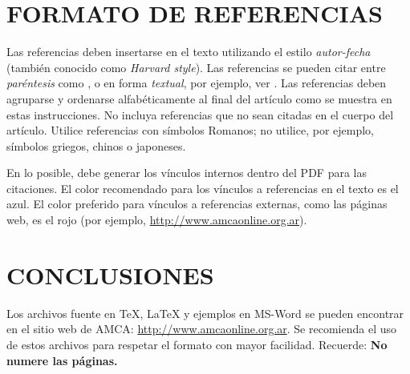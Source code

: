 \documentclass[oneside,a4paper,spanish,links]{amca}
\begin{document}
\section{FORMATO DE  REFERENCIAS}

Las referencias deben insertarse en el texto utilizando el estilo
\emph{autor-fecha} (también conocido como \emph{Harvard style}).
Las referencias se pueden citar entre \emph{paréntesis} como
\citep{zienkiewicz91,idelsohn94,meyer82,meyer82b},
 o en forma \emph{textual}, por ejemplo, ver
\citet{zienkiewicz91,idelsohn94,meyer82,meyer82b}. Las referencias
deben agruparse y ordenarse alfabéticamente al final del artículo
como se muestra en estas instrucciones. No incluya referencias que
no sean citadas en el cuerpo del artículo. Utilice referencias con
símbolos Romanos; no utilice, por ejemplo, símbolos griegos,
chinos o japoneses.

En lo posible, debe generar los vínculos internos dentro del PDF para las citaciones.
El color recomendado para los vínculos a referencias en el texto es el azul.
El color preferido para vínculos a referencias externas, como las páginas web,
 es el rojo (por ejemplo, \url{http://www.amcaonline.org.ar}).

\section{CONCLUSIONES}

Los archivos fuente en TeX, \LaTeX{} y ejemplos en MS-Word se
pueden encontrar en el sitio web de AMCA:
\url{http://www.amcaonline.org.ar}. Se recomienda el uso de estos archivos para respetar el formato con mayor facilidad. Recuerde: {\bf No numere las
páginas.}

%

\end{document}
